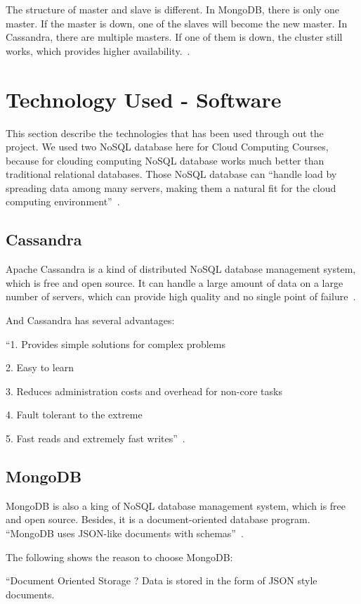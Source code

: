 The structure of master and slave is different. In MongoDB, there is only 
one master. If the master is down, one of the slaves will become the new
 master. In Cassandra, there are multiple masters. If one of them is down,
  the cluster still works, which provides higher 
  availability.~\cite{hid-sp18-508-background}.

\section{Technology Used - Software}
This section describe the technologies that has been used through out 
the project.
We used two NoSQL database here for Cloud Computing Courses, 
because for clouding computing NoSQL database works much better
than traditional relational databases. Those NoSQL database can ``handle load
by spreading data among many servers, making them a natural fit for the 
cloud computing environment''~\cite{hid-sp18-508-nosql}.


\subsection{Cassandra}
Apache Cassandra is a kind of distributed NoSQL database management 
system, which is free and open source. It can handle a large amount of 
data on a large number of servers, which can provide high quality and no 
single point of failure~\cite{hid-sp18-508-cassandra}. 

And Cassandra has several advantages:

``1. Provides simple solutions for complex problems

2. Easy to learn

3. Reduces administration costs and overhead for non-core tasks

4. Fault tolerant to the extreme

5. Fast reads and extremely fast writes''~\cite{hid-sp18-508-cassandraAd}. 


\subsection{MongoDB}
MongoDB is also a king of NoSQL database management system, which 
is free and open source. Besides, it is a document-oriented database 
program. ``MongoDB uses JSON-like documents with 
schemas''~\cite{hid-sp18-508-mongodb}.

The following shows the reason to choose MongoDB:

``Document Oriented Storage ? Data is stored in the form of 
JSON style documents.

